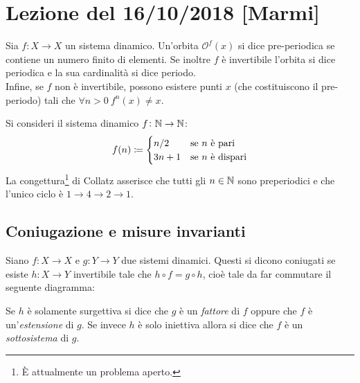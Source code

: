 \section{Lezione del 16/10/2018 [Marmi]}
\begin{definition} Sia $f\colon X \to X$ un sistema dinamico. Un'orbita $\mathcal{O}^f(x)$ si dice pre-periodica se contiene un numero finito di elementi. Se inoltre $ f $ è invertibile l'orbita si dice periodica e la sua cardinalità si dice periodo. \\
Infine, se $f$ non è invertibile, possono esistere punti $ x $ (che costituiscono il pre-periodo) tali che $ \forall n > 0\ f^n (x) \neq x $.
\end{definition}

\begin{example}
Si consideri il sistema dinamico $f \colon \mathbb{N} \to \mathbb{N}$:
\[
    f(n) \coloneqq
    \begin{cases}
        n/2  & \text{se $ n $ è pari}    \\
        3n+1 & \text{se $ n $ è dispari}
    \end{cases}
\]
La congettura\footnote{È attualmente un problema aperto.} di Collatz asserisce che tutti gli $n \in \mathbb{N}$ sono preperiodici e che l'unico ciclo è $ 1 \to 4 \to 2 \to 1 $.
\end{example}

\subsection{Coniugazione e misure invarianti}
\begin{definition}
Siano $f\colon X \to X$ e $g\colon Y \to Y$ due sistemi dinamici. Questi si dicono coniugati se esiste $h \colon X \to Y$ invertibile tale che $h \circ f = g \circ h$, cioè tale da far commutare il seguente diagramma:
\begin{center}
\end{center}
Se $h$ è solamente surgettiva si dice che $g$ è un \emph{fattore} di $f$ oppure che $f$ è un'\emph{estensione} di $g$. Se invece $h$ è solo iniettiva allora si dice che $f$ è un \emph{sottosistema} di $g$.
\end{definition}

